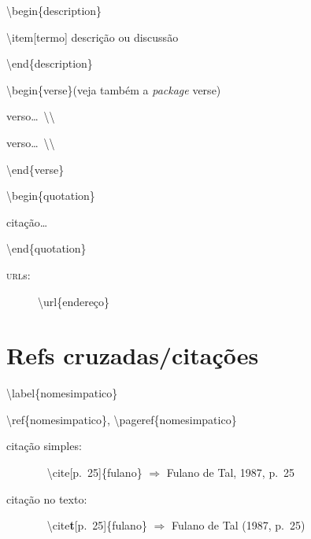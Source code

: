 \documentclass[10pt,twoside,english,brazilian]{article}
\begin{document}
\begin{multicols}{3}
\textbackslash{}begin\{description\}

\quad\textbackslash{}item[termo] descrição ou discussão

\textbackslash{}end\{description\}


\vspace{\baselineskip}


\textbackslash{}begin\{verse\}\quad (veja também a \textit{package} \textsf{verse})

\quad verso\dots\ \textbackslash\textbackslash

\quad verso\dots\ \textbackslash\textbackslash

\textbackslash{}end\{verse\}


\vspace{\baselineskip}


\textbackslash{}begin\{quotation\}

\quad citação\dots

\textbackslash{}end\{quotation\}


\vspace{\baselineskip}


\begin{description}
    \item[\textsc{url}s:] \textbackslash{}url\{endereço\}
\end{description}

\section*{Refs cruzadas/citações}

\textbackslash{}label\{nomesimpatico\}

\textbackslash{}ref\{nomesimpatico\},
\textbackslash{}pageref\{nomesimpatico\}


\vspace{\baselineskip}


\begin{description}
\item[citação simples:]~\vspace{2pt}\newline
    \null\quad\textbackslash{}cite[p.~25]\{fulano\} $\Rightarrow$ Fulano de Tal, 1987, p.~25\vspace{6pt}

  \item[citação no texto:]~\vspace{2pt}\newline
    \null\quad\textbackslash{}cite\textbf{t}[p.~25]\{fulano\} $\Rightarrow$ Fulano de Tal (1987, p.~25)\vspace{6pt}


\end{description}
\end{multicols}
\end{document}
